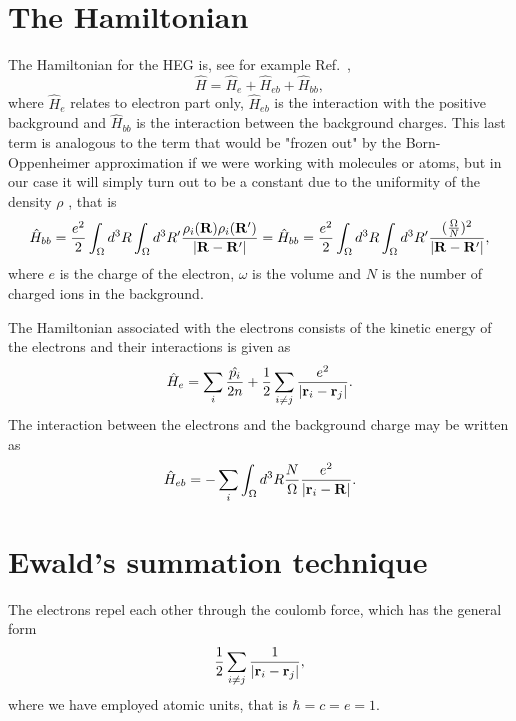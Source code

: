 \section{The Hamiltonian}

The Hamiltonian for the HEG is, see for example Ref.~\cite{GrossRungeHeinonen},
\begin{equation}
\hat{H} = \hat{H}_e + \hat{H}_{eb} + \hat{H}_{bb},
\label{eqn:h_HEG}
\end{equation}
where $\hat{H}_e$ relates to electron part only, $\hat{H}_{eb}$ is the
interaction with the positive background and $\hat{H}_{bb}$ is the
interaction between the background charges. This last term is
analogous to the term that would be "frozen out" by the
Born-Oppenheimer approximation if we were working with molecules or atoms, but in
our case it will simply turn out to be a constant due to the
uniformity of the density $\rho$ \cite{GrossRungeHeinonen}, that is
\begin{equation}
\hat{H}_{bb} = \frac{e^2}{2}  \int_{\Omega} d^3R \int_{\Omega} d^3R' \frac{\rho_i(\bold{R})\rho_i(\bold{R}')}{\vert \bold{R}-\bold{R}'\vert} = 
\hat{H}_{bb} = \frac{e^2}{2}  \int_{\Omega} d^3R \int_{\Omega} d^3R' \frac{(\frac{\Omega}{N})^2}{\vert \bold{R}-\bold{R}'\vert},
\label{eqn:h_b}
\end{equation}
where $e$ is the  charge of the electron, $\omega$ is the volume and $N$ is the number of charged ions in the background. 

The Hamiltonian associated with the electrons consists of the kinetic energy of the electrons and their interactions is given as
\begin{equation}
\hat{H}_e = \sum_{i} \frac{\hat{p_i}}{2n} + \frac{1}{2} \sum_{i \neq j} \frac{e^2}{\vert \bold{r}_i - \bold{r}_j \vert }.
\label{eqn:h_electron}
\end{equation}
The interaction between the electrons and the background charge may be written as
\begin{equation}
\hat{H}_{eb} = - \sum_{i} \int_\Omega d^3R \frac{N}{\Omega} \frac{e^2}{\vert \bold{r}_i - \bold{R} \vert }.
\label{eqn:h_eb}
\end{equation}

\section{Ewald's summation technique}

The electrons repel each other through the coulomb force, which has the general form
\begin{equation}
 \frac{1}{2} \sum_{i \neq j} \frac{1}{\vert \bold{r}_i - \bold{r}_j \vert },
\label{eqn:repulsion}
\end{equation}
where we have employed atomic units, that is $\hbar = c = e = 1$.

